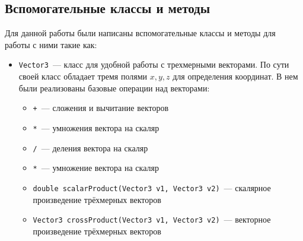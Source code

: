 \documentclass[a4paper,12pt]{article}
\begin{document}
\subsection{Вспомогательные классы и методы}
Для данной работы были написаны вспомогательные классы  и методы для работы с ними такие как:
\begin{itemize}
    \item \texttt{Vector3}~--- класс для удобной работы с трехмерными векторами. По сути своей класс обладает тремя полями $x,y,z$ для определения координат. В нем были реализованы базовые операции над векторами: 
    \begin{itemize}
      \sloppy
        \item \texttt{+}~--- сложения и вычитание векторов
        \item \texttt{*}~--- умножения вектора на скаляр
        \item \texttt{/}~--- деления вектора на скаляр
        \item \texttt{*}~--- умножение вектора на скаляр
        \item \texttt{double scalarProduct(Vector3 v1, Vector3 v2)}~--- скалярное произведение трёхмерных векторов
        \item \texttt{Vector3 crossProduct(Vector3 v1, Vector3 v2)}~--- векторное произведение трёхмерных векторов
  

\end{itemize}
\end{itemize}
\end{document}
